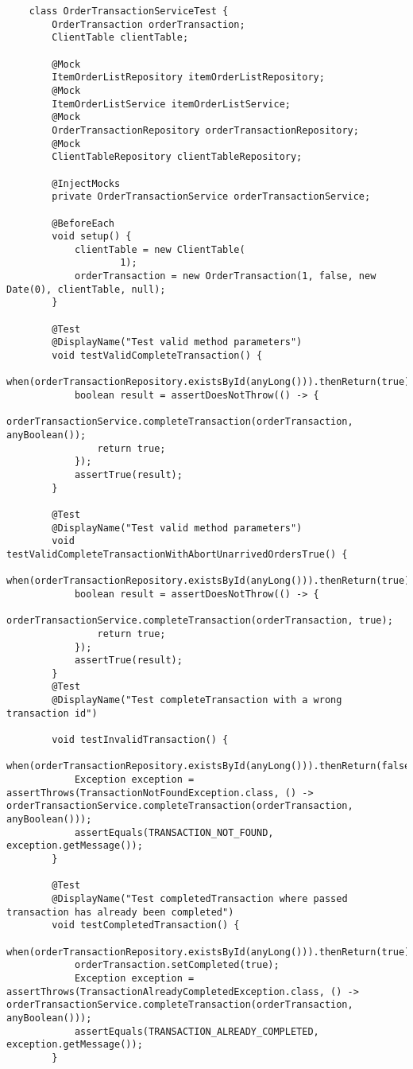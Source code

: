 \label{elsrc:OrderTransactionServiceTest}
\begin{verbatim}
	class OrderTransactionServiceTest {
		OrderTransaction orderTransaction;
		ClientTable clientTable;

		@Mock
		ItemOrderListRepository itemOrderListRepository;
		@Mock
		ItemOrderListService itemOrderListService;
		@Mock
		OrderTransactionRepository orderTransactionRepository;
		@Mock
		ClientTableRepository clientTableRepository;

		@InjectMocks
		private OrderTransactionService orderTransactionService;

		@BeforeEach
		void setup() {
			clientTable = new ClientTable(
					1);
			orderTransaction = new OrderTransaction(1, false, new Date(0), clientTable, null);
		}

		@Test
		@DisplayName("Test valid method parameters")
		void testValidCompleteTransaction() {
			when(orderTransactionRepository.existsById(anyLong())).thenReturn(true);
			boolean result = assertDoesNotThrow(() -> {
				orderTransactionService.completeTransaction(orderTransaction, anyBoolean());
				return true;
			});
			assertTrue(result);
		}

		@Test
		@DisplayName("Test valid method parameters")
		void testValidCompleteTransactionWithAbortUnarrivedOrdersTrue() {
			when(orderTransactionRepository.existsById(anyLong())).thenReturn(true);
			boolean result = assertDoesNotThrow(() -> {
				orderTransactionService.completeTransaction(orderTransaction, true);
				return true;
			});
			assertTrue(result);
		}
		@Test
		@DisplayName("Test completeTransaction with a wrong transaction id")

		void testInvalidTransaction() {
			when(orderTransactionRepository.existsById(anyLong())).thenReturn(false);
			Exception exception = assertThrows(TransactionNotFoundException.class, () -> orderTransactionService.completeTransaction(orderTransaction,  anyBoolean()));
			assertEquals(TRANSACTION_NOT_FOUND, exception.getMessage());
		}

		@Test
		@DisplayName("Test completedTransaction where passed transaction has already been completed")
		void testCompletedTransaction() {
			when(orderTransactionRepository.existsById(anyLong())).thenReturn(true);
			orderTransaction.setCompleted(true);
			Exception exception = assertThrows(TransactionAlreadyCompletedException.class, () -> orderTransactionService.completeTransaction(orderTransaction,  anyBoolean()));
			assertEquals(TRANSACTION_ALREADY_COMPLETED, exception.getMessage());
		}


\end{verbatim}
